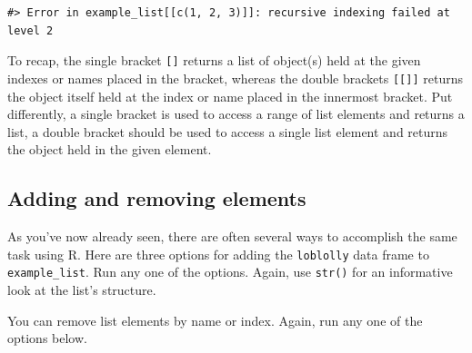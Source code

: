 \documentclass[
  11pt,
]{krantz}
\newenvironment{Shaded}{\begin{snugshade}}{\end{snugshade}}
\newcommand{\CommentTok}[1]{\textcolor[rgb]{0.56,0.35,0.01}{\textit{#1}}}
\newcommand{\DataTypeTok}[1]{\textcolor[rgb]{0.13,0.29,0.53}{#1}}
\newcommand{\DecValTok}[1]{\textcolor[rgb]{0.00,0.00,0.81}{#1}}
\newcommand{\KeywordTok}[1]{\textcolor[rgb]{0.13,0.29,0.53}{\textbf{#1}}}
\newcommand{\NormalTok}[1]{#1}
\newcommand{\OperatorTok}[1]{\textcolor[rgb]{0.81,0.36,0.00}{\textbf{#1}}}
\newcommand{\OtherTok}[1]{\textcolor[rgb]{0.56,0.35,0.01}{#1}}
\newcommand{\StringTok}[1]{\textcolor[rgb]{0.31,0.60,0.02}{#1}}
\theoremstyle{definition}
\theoremstyle{definition}
\theoremstyle{definition}
\theoremstyle{definition}
\theoremstyle{remark}
\begin{document}
\begin{verbatim}
#> Error in example_list[[c(1, 2, 3)]]: recursive indexing failed at level 2
\end{verbatim}

To recap, the single bracket \texttt{{[}{]}} returns a list of object(s) held at the given indexes or names placed in the bracket, whereas the double brackets \texttt{{[}{[}{]}{]}} returns the object itself held at the index or name placed in the innermost bracket. Put differently, a single bracket is used to access a range of list elements and returns a list, a double bracket should be used to access a single list element and returns the object held in the given element.

\hypertarget{adding-and-removing-elements}{%
\subsection{Adding and removing elements}\label{adding-and-removing-elements}}

As you've now already seen, there are often several ways to accomplish the same task using R. Here are three options for adding the \texttt{loblolly} data frame to \texttt{example\_list}. Run any one of the options. Again, use \texttt{str()} for an informative look at the list's structure.

\begin{Shaded}
\end{Shaded}

You can remove list elements by name or index. Again, run any one of the options below.

\begin{Shaded}
\end{Shaded}
\end{document}
